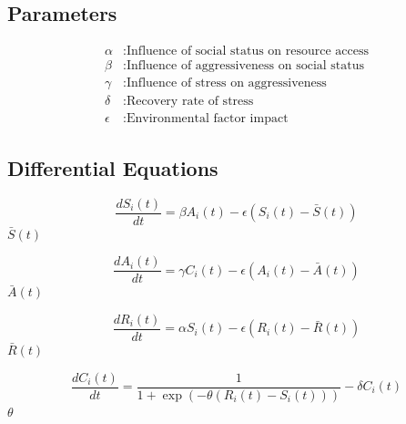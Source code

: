 \documentclass[english, a4paper, 11pt]{article}
\begin{document}
\subsection*{Parameters}
\begin{align*}
\alpha &: \text{Influence of social status on resource access} \\
\beta &: \text{Influence of aggressiveness on social status} \\
\gamma &: \text{Influence of stress on aggressiveness} \\
\delta &: \text{Recovery rate of stress} \\
\epsilon &: \text{Environmental factor impact}
\end{align*}

\subsection*{Differential Equations}

\begin{equation}
\frac{dS_i(t)}{dt} = \beta A_i(t) - \epsilon (S_i(t) - \bar{S}(t))
\end{equation}
 $\bar{S}(t)$ 

\begin{equation}
\frac{dA_i(t)}{dt} = \gamma C_i(t) - \epsilon (A_i(t) - \bar{A}(t))
\end{equation}
 $\bar{A}(t)$ 

\begin{equation}
\frac{dR_i(t)}{dt} = \alpha S_i(t) - \epsilon (R_i(t) - \bar{R}(t))
\end{equation}
 $\bar{R}(t)$ 

\begin{equation}
\frac{dC_i(t)}{dt} = \frac{1}{1 + \exp(-\theta (R_i(t) - S_i(t)))} - \delta C_i(t)
\end{equation}
 $\theta$ 
\end{document}
